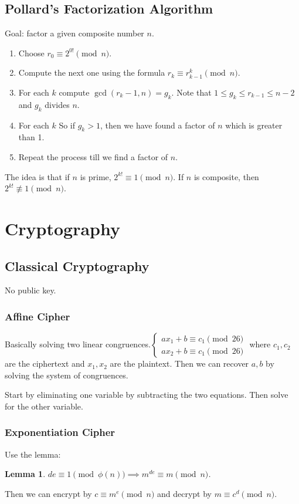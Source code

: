 \documentclass[letterpaper,12pt,oneside]{article}
\newtheorem*{lemma}{Lemma}
\begin{document}
\subsection{Pollard's Factorization Algorithm}
Goal: factor a given composite number $n$.\begin{enumerate}
    \item Choose $r_0\equiv 2^{0!}\pmod n$.
    \item Compute the next one using the formula $r_k\equiv r_{k-1}^{k} \pmod n$.
    \item For each $k$ compute $\gcd(r_{k}-1,n)=g_k$. Note that $1\le g_k \le r_{k-1} \le n-2$ and $g_k$ divides $n$.
    \item For each $k$  So if $g_k > 1$, then we have found a factor of $n$ which is greater than 1.
    \item Repeat the process till we find a factor of $n$.
\end{enumerate}
The idea is that if $n$ is prime, $2^{k!}\equiv 1\pmod n$. If $n$ is composite, then $2^{k!}\not\equiv 1\pmod n$.
\section{Cryptography}
\subsection{Classical Cryptography}
No public key. 
\subsubsection{Affine Cipher}
Basically solving two linear congruences.$\begin{cases}
    ax_1+b\equiv c_1\pmod{26}\\
    ax_2+b\equiv c_1\pmod{26}
\end{cases}$ where $c_1,c_2$ are the ciphertext and $x_1,x_2$ are the plaintext. Then we can recover $a,b$ by solving the system of congruences.

Start by eliminating one variable by subtracting the two equations. Then solve for the other variable.
\subsubsection{Exponentiation Cipher}
Use the lemma: \begin{lemma}
    $de\equiv 1\pmod{\phi(n)} \implies m^{de}\equiv m\pmod{n}$.
\end{lemma}
Then we can encrypt by $c\equiv m^e\pmod{n}$ and decrypt by $m\equiv c^d\pmod{n}$.
\end{document}
